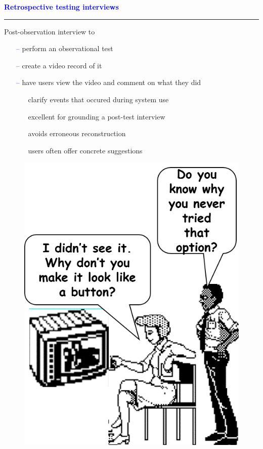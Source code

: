 \documentclass[pdf]{beamer}
\begin{document}
{%
{
\begin{frame}
	\vspace{8mm}
	\textcolor{Blue}{\textbf{\large{Retrospective testing interviews}}}
    \textcolor{red}{\rule{10cm}{1mm}}
    Post-observation interview to
    \begin{itemize}
      \item[\textcolor{Blue}{--}] perform an observational test
      \item[\textcolor{Blue}{--}] create a video record of it
      \item[\textcolor{Blue}{--}] have users view the video and comment on what they did
      \begin{itemize}
        \item[\textcolor{Blue}{\textbullet}] clarify events that occured during system use
        \item[\textcolor{Blue}{\textbullet}] excellent for grounding a post-test interview
        \item[\textcolor{Blue}{\textbullet}] avoids erroneous reconstruction
        \item[\textcolor{Blue}{\textbullet}] users often offer concrete suggestions
      \end{itemize}
    \end{itemize}
    \vspace{-1.5cm}
    \begin{figure}[b]
    	\includegraphics[scale = 0.4, right]{23_Imagine.png}
    \end{figure}
\end{frame}}


}
\end{document}

